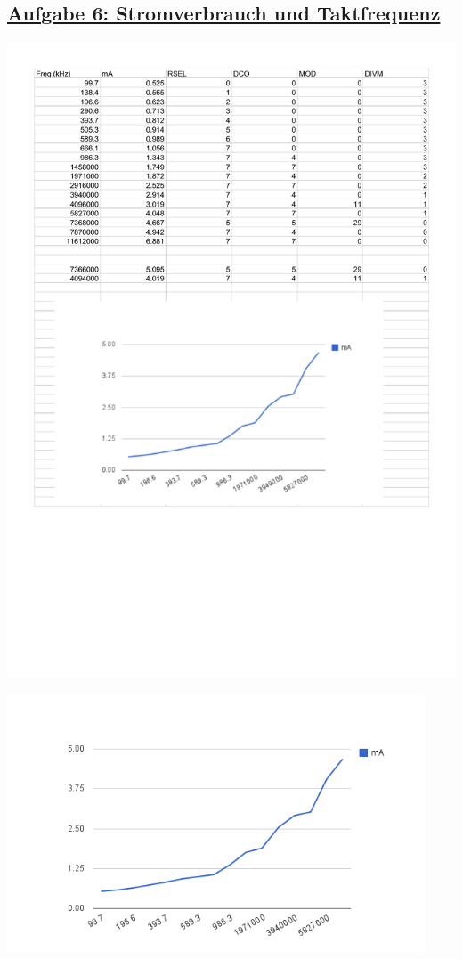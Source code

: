 \subsection*
{\href{http://cst.mi.fu-berlin.de/intern/19606-P-MPP/Aufgaben/040202.html}
{Aufgabe 6: Stromverbrauch und Taktfrequenz}}

\includegraphics[width=\textwidth]{aufgaben/06/DCOCLK.pdf}

\includegraphics[width=0.93\textwidth]{aufgaben/06/chart_1.png}

